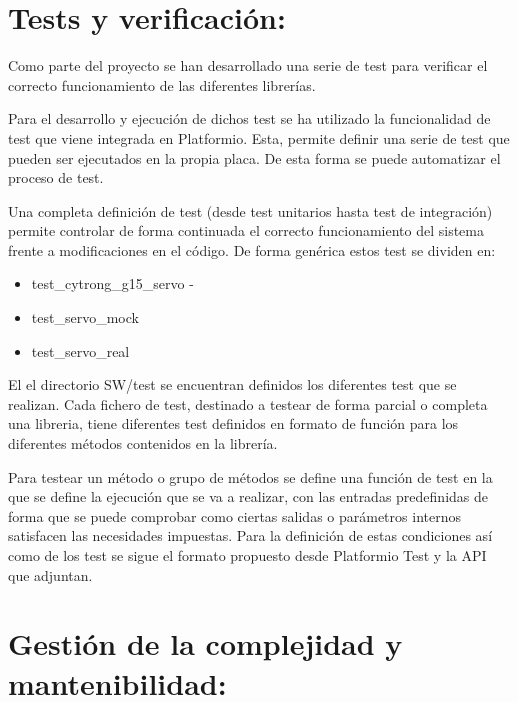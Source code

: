 \section{Tests y verificación:}
    Como parte del proyecto se han desarrollado una serie de test para verificar el correcto funcionamiento de las diferentes librerías.

    Para el desarrollo y ejecución de dichos test se ha utilizado la funcionalidad de test que viene integrada en Platformio. Esta, permite definir una serie de test que pueden ser ejecutados en la propia placa. De esta forma se puede automatizar el proceso de test.

    Una completa definición de test (desde test unitarios hasta test de integración) permite controlar de forma continuada el correcto funcionamiento del sistema frente a modificaciones en el código. De forma genérica estos test se dividen en:

    \begin{itemize}
        \item test_cytrong_g15_servo -
        \item test_servo_mock
        \item test_servo_real
    \end{itemize}

    El el directorio SW/test se encuentran definidos los diferentes test que se realizan. Cada fichero de test, destinado a testear de forma parcial o completa una libreria, tiene diferentes test definidos en formato de función para los diferentes métodos contenidos en la librería.

    Para testear un método o grupo de métodos se define una función de test en la que se define la ejecución que se va a realizar, con las entradas predefinidas de forma que se puede comprobar como ciertas salidas o parámetros internos satisfacen las necesidades impuestas. Para la definición de estas condiciones así como de los test se sigue el formato propuesto desde Platformio Test y la API que adjuntan.


\section{Gestión de la complejidad y mantenibilidad:}
